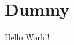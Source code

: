 \documentclass[../main.tex]{subfiles}
\begin{document}
    \section{Dummy}
    Hello World!
    \newpage
\end{document}
